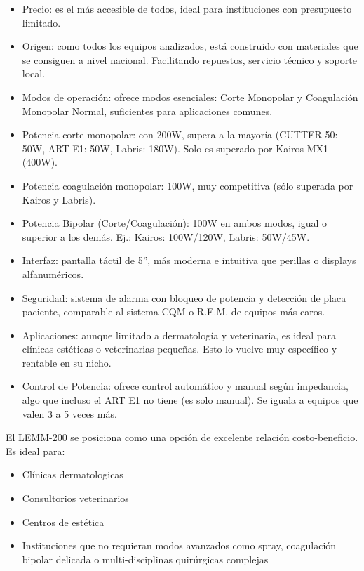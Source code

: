 \documentclass[10pt, conference, final, twocolumn, sansserif]{IEEEtran}
\begin{document}
\begin{itemize}
    \item Precio: es el más accesible de todos,  ideal para instituciones con presupuesto limitado.
    \item Origen: como todos los equipos analizados, está construido con materiales que se consiguen a nivel nacional. Facilitando repuestos, servicio técnico y soporte local.
    \item Modos de operación: ofrece modos esenciales: Corte Monopolar y Coagulación Monopolar Normal, suficientes para aplicaciones comunes.
    \item Potencia corte monopolar: con 200W, supera a la mayoría (CUTTER 50: 50W, ART E1: 50W, Labris: 180W). Solo es superado por Kairos MX1 (400W).
    \item Potencia coagulación  monopolar: 100W, muy competitiva (sólo superada por Kairos y Labris).
    \item Potencia Bipolar (Corte/Coagulación): 100W en ambos modos, igual o superior a los demás. Ej.: Kairos: 100W/120W, Labris: 50W/45W.
    \item Interfaz: pantalla táctil de 5”, más moderna e intuitiva que perillas o displays alfanuméricos.
    \item Seguridad: sistema de alarma con bloqueo de potencia y detección de placa paciente, comparable al sistema CQM o R.E.M. de equipos más caros.
    \item Aplicaciones: aunque limitado a dermatología y veterinaria, es ideal para clínicas estéticas o veterinarias pequeñas. Esto lo vuelve muy específico y rentable en su nicho.
    \item Control de Potencia: ofrece control automático y manual según impedancia, algo que incluso el ART E1 no tiene (es solo manual). Se iguala a equipos que valen 3 a 5 veces más.
\end{itemize}

El LEMM-200 se posiciona como una opción de excelente relación costo-beneficio. Es ideal para:
\begin{itemize}
    \item Clínicas dermatologicas
    \item Consultorios veterinarios
    \item Centros de estética
    \item Instituciones que no requieran modos avanzados como spray, coagulación bipolar delicada o multi-disciplinas quirúrgicas complejas
\end{itemize}

%
\end{document}
